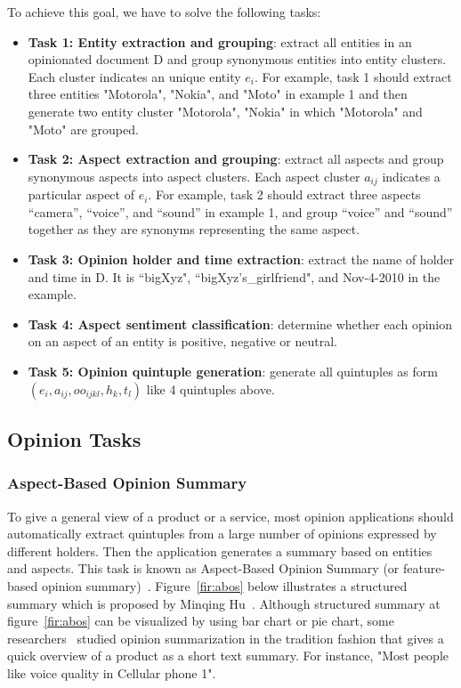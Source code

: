 \documentclass{article}
\begin{document}
To achieve this goal, we have to solve the following tasks:
\begin{itemize}
    \item \textbf{Task 1: Entity extraction and grouping}: extract all entities in an opinionated document D and group synonymous entities into entity clusters. Each cluster indicates an unique entity $e_i$. For example, task 1 should extract three entities "Motorola", "Nokia", and "Moto" in example 1 and then generate two entity cluster "Motorola", "Nokia" in which "Motorola" and "Moto" are grouped.
    \item \textbf{Task 2: Aspect extraction and grouping}: extract all aspects and group synonymous aspects into aspect clusters. Each aspect cluster $a_{ij}$ indicates a particular aspect of $e_i$. For example, task 2 should extract three aspects “camera”, “voice”, and “sound” in example 1, and group “voice” and “sound” together as they are synonyms representing the same aspect.
    \item \textbf{Task 3: Opinion holder and time extraction}: extract the name of holder and time in D. It is “bigXyz", “bigXyz's\_girlfriend", and Nov-4-2010 in the example.
    \item \textbf{Task 4: Aspect sentiment classification}: determine whether each opinion on an aspect of an entity is positive, negative or neutral. 
    \item \textbf{Task 5: Opinion quintuple generation}: generate all quintuples as form $(e_i, a_{ij}, oo_{ijkl}, h_k, t_l)$ like 4 quintuples above.
\end{itemize}


\subsection{Opinion Tasks}
\subsubsection{Aspect-Based Opinion Summary}

To give a general view of a product or a service, most opinion applications should automatically extract quintuples from a large number of opinions expressed by different holders. 
Then the application generates a summary based on entities and aspects.
This task is known as Aspect-Based Opinion Summary (or feature-based opinion summary)~\cite{Hu:2004:MSC:1014052.1014073, Liu:2005:OOA:1060745.1060797}.
Figure~\ref{fir:abos} below illustrates a structured summary which is proposed by     Minqing Hu~\cite{Hu:2004:MSC:1014052.1014073}. 
Although structured summary at figure~\ref{fir:abos} can be visualized by using bar chart or pie chart, some researchers~\cite{Beineke04anexploration,COIN:COIN417,Ku2016,Seki06opinion-focusedsummarization,Stoyanov:2006:PSC:1610075.1610123} studied opinion summarization in the tradition fashion that gives a quick overview of a product as a short text summary. 
For instance, "Most people like voice quality in Cellular phone 1".
\end{document}
